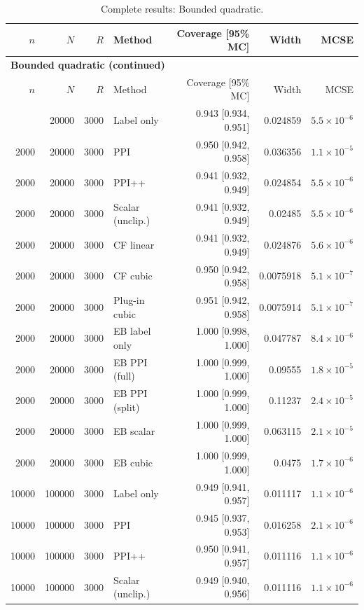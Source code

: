 {\setlength{\tabcolsep}{3pt}\begin{longtable}{rrrlrrr}
\caption{Complete results: Bounded quadratic.}\\
\toprule $n$ & $N$ & $R$ & Method & Coverage [95\% MC] & Width & MCSE \\
\midrule\endfirsthead
\multicolumn{7}{l}{\textbf{Bounded quadratic (continued)}}\\
\toprule $n$ & $N$ & $R$ & Method & Coverage [95\% MC] & Width & MCSE \\
\midrule\endhead
\bottomrule\endfoot
2000 & 20000 & 3000 & Label only & 0.943 [0.934, 0.951] & 0.024859 & $5.5\times 10^{-6}$ \\
2000 & 20000 & 3000 & PPI & 0.950 [0.942, 0.958] & 0.036356 & $1.1\times 10^{-5}$ \\
2000 & 20000 & 3000 & PPI++ & 0.941 [0.932, 0.949] & 0.024854 & $5.5\times 10^{-6}$ \\
2000 & 20000 & 3000 & Scalar (unclip.) & 0.941 [0.932, 0.949] & 0.02485 & $5.5\times 10^{-6}$ \\
2000 & 20000 & 3000 & CF linear & 0.941 [0.932, 0.949] & 0.024876 & $5.6\times 10^{-6}$ \\
2000 & 20000 & 3000 & CF cubic & 0.950 [0.942, 0.958] & 0.0075918 & $5.1\times 10^{-7}$ \\
2000 & 20000 & 3000 & Plug-in cubic & 0.951 [0.942, 0.958] & 0.0075914 & $5.1\times 10^{-7}$ \\
2000 & 20000 & 3000 & EB label only & 1.000 [0.998, 1.000] & 0.047787 & $8.4\times 10^{-6}$ \\
2000 & 20000 & 3000 & EB PPI (full) & 1.000 [0.999, 1.000] & 0.09555 & $1.8\times 10^{-5}$ \\
2000 & 20000 & 3000 & EB PPI (split) & 1.000 [0.999, 1.000] & 0.11237 & $2.4\times 10^{-5}$ \\
2000 & 20000 & 3000 & EB scalar & 1.000 [0.999, 1.000] & 0.063115 & $2.1\times 10^{-5}$ \\
2000 & 20000 & 3000 & EB cubic & 1.000 [0.999, 1.000] & 0.0475 & $1.7\times 10^{-6}$ \\
10000 & 100000 & 3000 & Label only & 0.949 [0.941, 0.957] & 0.011117 & $1.1\times 10^{-6}$ \\
10000 & 100000 & 3000 & PPI & 0.945 [0.937, 0.953] & 0.016258 & $2.1\times 10^{-6}$ \\
10000 & 100000 & 3000 & PPI++ & 0.950 [0.941, 0.957] & 0.011116 & $1.1\times 10^{-6}$ \\
10000 & 100000 & 3000 & Scalar (unclip.) & 0.949 [0.940, 0.956] & 0.011116 & $1.1\times 10^{-6}$ \\

\end{longtable}}
